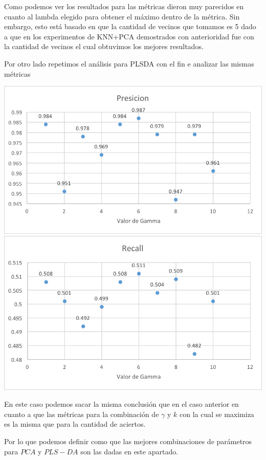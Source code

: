 Como podemos ver los resultados para las métricas dieron muy parecidos en cuanto al lambda elegido para obtener el máximo dentro de la métrica. Sin embargo, esto está basado en que la cantidad de vecinos que tomamos es 5 dado a que en los experimentos de KNN+PCA demostrados con anterioridad fue con la cantidad de vecinos el cual obtuvimos los mejores resultados.

Por otro lado repetimos el análisis para PLSDA con el fin e analizar las mismas métricas

\includegraphics[scale=1]{imagenes/plsdaPresicion.png}\\
\includegraphics[scale=1]{imagenes/plsdaRecall.png}

En este caso podemos sacar la misma conclusión que en el caso anterior en cuanto a que las métricas para la combinación de $\gamma$ y $k$ con la cual se maximiza es la misma que para la cantidad de aciertos. 

Por lo que podemos definir como que las mejores combinaciones de parámetros para $PCA$ y $PLS-DA$ son las dadas en este apartado.

